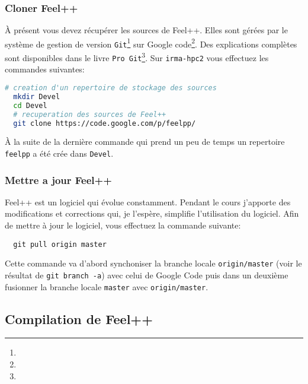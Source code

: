 \subsubsection{Cloner Feel++}
\label{sec:cloner-feel++}


À présent vous devez récupérer les sources de Feel++. Elles sont gérées par le
système de gestion de version \texttt{Git}\footnote{}
sur Google code\footnote{}. Des explications
complètes sont disponibles dans le livre \texttt{Pro Git}\footnote{}. Sur
\texttt{irma-hpc2} vous effectuez les commandes suivantes:
\begin{lstlisting}[language=sh]
  # creation d'un repertoire de stockage des sources
  mkdir Devel
  cd Devel
  # recuperation des sources de Feel++
  git clone https://code.google.com/p/feelpp/
\end{lstlisting}
À la suite de la dernière commande qui prend un peu de temps un repertoire
\texttt{feelpp} a été crée dans \texttt{Devel}.

\subsubsection{Mettre a jour Feel++}
\label{sec:mettre-jour-feel++}

Feel++ est un logiciel qui évolue constamment. Pendant le cours j'apporte des
modifications et corrections qui, je l'espère, simplifie l'utilisation du
logiciel. Afin de mettre à jour le logiciel, vous effectuez la commande
suivante:
\begin{lstlisting}
  git pull origin master
\end{lstlisting}
Cette commande va d'abord synchoniser la branche locale
\lstinline!origin/master! (voir le résultat de \lstinline!git branch -a!) avec
celui de Google Code puis dans un deuxième fusionner la branche locale
\lstinline!master! avec \lstinline!origin/master!.


\subsection{Compilation de Feel++}
\label{sec:comp-de-feel++}

